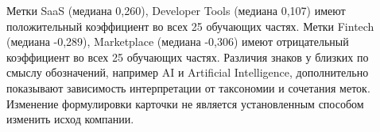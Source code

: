 Метки SaaS (медиана 0,260), Developer Tools (медиана 0,107) имеют положительный коэффициент во всех 25 обучающих частях. Метки Fintech (медиана -0,289), Marketplace (медиана -0,306) имеют отрицательный коэффициент во всех 25 обучающих частях. Различия знаков у близких по смыслу обозначений, например AI и Artificial Intelligence, дополнительно показывают зависимость интерпретации от таксономии и сочетания меток. Изменение формулировки карточки не является установленным способом изменить исход компании.
